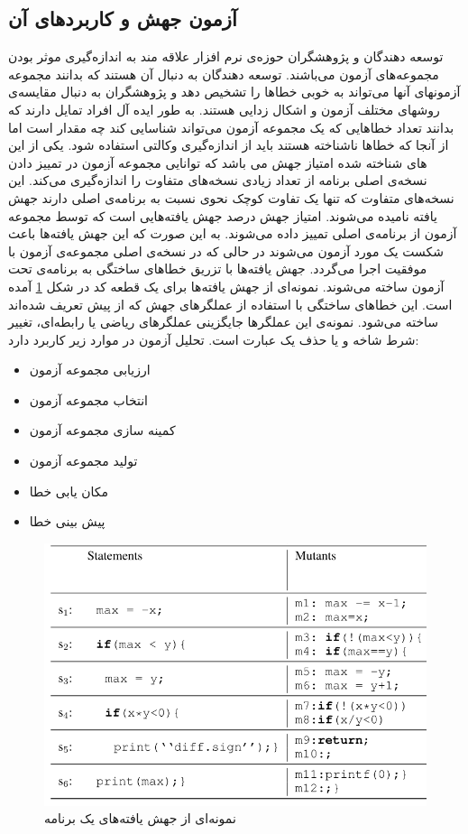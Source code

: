 
\subsection{آزمون جهش و کاربردهای آن}
توسعه دهندگان و پژوهشگران حوزه‌ی نرم افزار علاقه مند به اندازه‌گیری موثر بودن مجموعه‌های آزمون می‌باشند. توسعه دهندگان به دنبال آن هستند که بدانند مجموعه آزمونهای آنها می‌تواند به خوبی خطاها را تشخیص دهد و پژوهشگران به دنبال مقایسه‌ی روشهای مختلف آزمون و اشکال زدایی  هستند. به طور ایده آل افراد تمایل دارند که بدانند تعداد خطاهایی که یک مجموعه آزمون می‌تواند شناسایی کند چه مقدار است اما از آنجا که خطاها ناشناخته هستند باید از اندازه‌گیری  وکالتی استفاده شود. یکی از این ‌‌‌‌‌‌‌‌های شناخته شده امتیاز جهش  می‌ باشد که توانایی مجموعه آزمون در تمییز دادن نسخه‌ی اصلی برنامه از تعداد زیادی نسخه‌های متفاوت را اندازه‌گیری می‌کند. این نسخه‌های متفاوت که تنها یک تفاوت کوچک نحوی نسبت به برنامه‌ی اصلی دارند جهش یافته نامیده می‌شوند. امتیاز جهش درصد جهش یافته‌هایی  است که توسط مجموعه آزمون از برنامه‌ی اصلی تمییز داده می‌شوند. به این صورت که این جهش یافته‌ها باعث شکست یک مورد آزمون می‌شوند در حالی که در نسخه‌ی اصلی مجموعه‌ی آزمون با موفقیت اجرا می‌گردد. جهش یافته‌ها با تزریق خطاهای ساختگی به برنامه‌ی تحت آزمون  ساخته می‌شوند.  نمونه‌ای از  جهش یافته‌ها  برای یک قطعه کد در شکل \ref{fig:mutant} آمده است. این خطاهای ساختگی با استفاده از عملگرهای جهش که از پیش تعریف شده‌اند ساخته می‌شود. نمونه‌ی این عملگرها جایگزینی عملگرهای ریاضی یا رابطه‌ای، تغییر شرط شاخه  و یا حذف یک عبارت است\cite{just2014mutants}. تحلیل آزمون در موارد زیر کاربرد دارد:
\begin{itemize}
	\setlength\itemsep{.01em}	
	\item 
	ارزیابی مجموعه آزمون
	\item 
	انتخاب مجموعه آزمون
	\item 
	 کمینه سازی مجموعه آزمون
	\item 
	 تولید مجموعه آزمون
	\item 
	مکان یابی خطا
	\item 
	پیش بینی خطا
\end{itemize}

\begin{figure}[H]
	\centering
	\includegraphics[width=.6\textwidth]{images/mutants.PNG}
	\caption{ نمونه‌ای از جهش یافته‌های یک برنامه \cite{moon2014ask}}
	\label{fig:mutant}
\end{figure}

